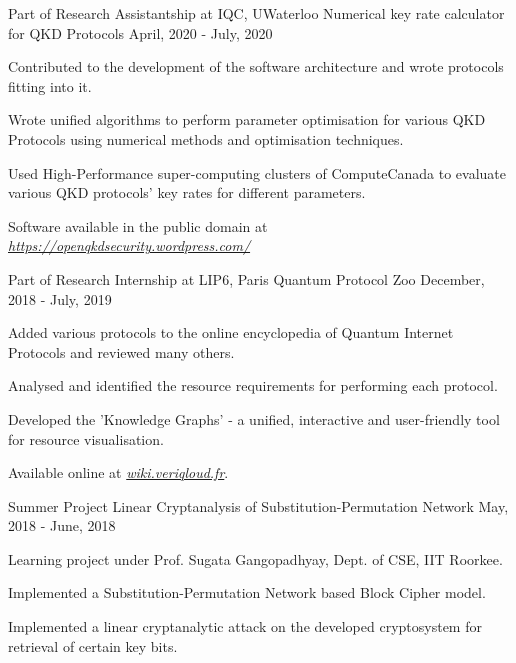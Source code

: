 \begin{cventries}
  \cventry
    {Part of Research Assistantship at IQC, UWaterloo} %
    {Numerical key rate calculator for QKD Protocols} %
    {} %
    {April, 2020 - July, 2020} %
    {
      \begin{cvitems} %
        \item {Contributed to the development of the software architecture and wrote protocols fitting into it.}
        \item {Wrote unified algorithms to perform parameter optimisation for various QKD Protocols using numerical methods and optimisation techniques.}
        \item {Used High-Performance super-computing clusters of ComputeCanada to evaluate various QKD protocols' key rates for different parameters.}
        \item {Software available in the public domain at \emph{\href{https://openqkdsecurity.wordpress.com/}{https://openqkdsecurity.wordpress.com/}}}
      \end{cvitems}
    }
    
  \cventry
    {Part of Research Internship at LIP6, Paris} %
    {Quantum Protocol Zoo} %
    {} %
    {December, 2018 - July, 2019} %
    {
      \begin{cvitems} %
        \item {Added various protocols to the online encyclopedia of Quantum Internet Protocols and reviewed many others.}
        \item {Analysed and identified the resource requirements for performing each protocol.}
        \item {Developed the 'Knowledge Graphs' - a unified, interactive and user-friendly tool for resource visualisation.}
        \item {Available online at  \emph{\href{https://wiki.veriqloud.fr}{wiki.veriqloud.fr}}.}
      \end{cvitems}
    }

  \cventry
    {Summer Project} %
    {Linear Cryptanalysis of Substitution-Permutation Network} %
    {} %
    {May, 2018 - June, 2018} %
    {
      \begin{cvitems} %
        \item {Learning project under Prof. Sugata Gangopadhyay, Dept. of CSE, IIT Roorkee.}
        \item {Implemented a Substitution-Permutation Network based Block Cipher model.}
        \item {Implemented a linear cryptanalytic attack on the developed cryptosystem for retrieval of certain key bits.}
      \end{cvitems}
    }


\end{cventries}
